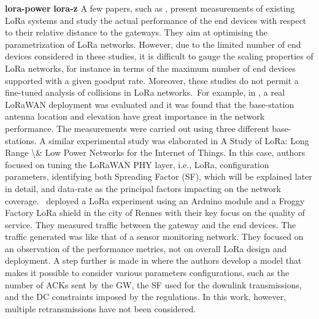 \textbf{lora-power} \newline  \cite{sartori_smart_2016}    \newline 
 \cite{tunc_markov_2017}    \newline 
 \cite{zurita_ares_power_2007}    \newline 
\textbf{lora-z} \newline  \cite{petric_measurements_2016}   A few papers, such as \cite{petric_measurements_2016}, present measurements of existing LoRa systems and study the actual performance of the end devices with respect to their relative distance to the gateways. They aim at optimising the parametrization of LoRa networks. However, due to the limited number of end devices considered in these studies, it is difficult to gauge the scaling properties of LoRa networks, for instance in terms of the maximum number of end devices supported with a given goodput rate. Moreover, these studies do not permit a fine-tuned analysis of collisions in LoRa networks.~For example, in \cite{petric_measurements_2016-1}, a real LoRaWAN deployment was evaluated and it was found that the base-station antenna location and elevation have great importance in the network performance. The measurements were carried out using three different base-stations. A similar experimental study was elaborated in A Study of LoRa: Long Range \textbackslash\& Low Power Networks for the Internet of Things. In this case, authors focused on tuning the LoRaWAN PHY layer, i.e., LoRa, configuration parameters, identifying both Spreading Factor (SF), which will be explained later in detail, and data-rate as the principal factors impacting on the network coverage.~\citet{petric_measurements_2016} deployed a LoRa experiment using an Arduino module and a Froggy Factory LoRa shield in the city of Rennes with their key focus on the quality of service. They measured traffic between the gateway and the end devices. The traffic generated was like that of a sensor monitoring network. They focused on an observation of the performance metrics, not on overall LoRa design and deployment.   \newline 
 \cite{capuzzo_mathematical_2018}   A step further is made in \cite{capuzzo_mathematical_2018} where the authors develop a model that makes it possible to consider various parameters configurations, such as the number of ACKs sent by the GW, the SF used for the downlink transmissions, and the DC constraints imposed by the regulations. In this work, however, multiple retransmissions have not been considered.~   \newline 
